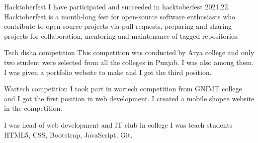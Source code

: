    {Hacktoberfest}
    {}
    {}
    {}
    {I have participated and succeeded in hacktoberfest 2021,22. Hacktoberfest is a month-long fest for open-source software enthusiasts who contribute to open-source projects via pull requests, preparing and sharing projects for collaboration, mentoring and maintenance of tagged repositories.}
    {}


    {Tech disha competition}
    {}
    {}
    {}
    {This competition was conducted by Arya college and only two student were selected from all the colleges in Punjab. I was also among them. I was given a portfolio website to make and I got the third position.}
    {}

    
    {Wartech competition}
    {}
    {}
    {}
    {I took part in wartech competition from GNIMT college and I got the first position in web development. I created a mobile shopee website in the competition.}
    {}



    {I was head of web development and IT club in college}
    {}
    {}
    {}
    {I was teach students HTML5, CSS, Bootstrap, JavaScript, Git.}
    {}

